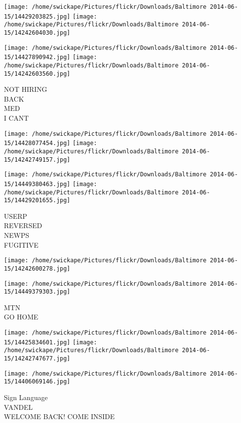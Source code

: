\documentclass[10pt,letterpaper]{article}
\begin{document}
\texttt{[image: /home/swickape/Pictures/flickr/Downloads/Baltimore 2014-06-15/14429203825.jpg]}
\texttt{[image: /home/swickape/Pictures/flickr/Downloads/Baltimore 2014-06-15/14242604030.jpg]}

\texttt{[image: /home/swickape/Pictures/flickr/Downloads/Baltimore 2014-06-15/14427890942.jpg]}
\texttt{[image: /home/swickape/Pictures/flickr/Downloads/Baltimore 2014-06-15/14242603560.jpg]}

NOT HIRING\\
BACK\\
MED\\
I CANT\\
\pagebreak

\texttt{[image: /home/swickape/Pictures/flickr/Downloads/Baltimore 2014-06-15/14428077454.jpg]}
\texttt{[image: /home/swickape/Pictures/flickr/Downloads/Baltimore 2014-06-15/14242749157.jpg]}

\texttt{[image: /home/swickape/Pictures/flickr/Downloads/Baltimore 2014-06-15/14449380463.jpg]}
\texttt{[image: /home/swickape/Pictures/flickr/Downloads/Baltimore 2014-06-15/14429201655.jpg]}

USERP\\
REVERSED\\
NEWPS\\
FUGITIVE\\
\pagebreak

\texttt{[image: /home/swickape/Pictures/flickr/Downloads/Baltimore 2014-06-15/14242600278.jpg]}

\vspace{0.25in}
\texttt{[image: /home/swickape/Pictures/flickr/Downloads/Baltimore 2014-06-15/14449379303.jpg]}

MTN\\
GO HOME\\
\pagebreak

\texttt{[image: /home/swickape/Pictures/flickr/Downloads/Baltimore 2014-06-15/14425834601.jpg]}
\texttt{[image: /home/swickape/Pictures/flickr/Downloads/Baltimore 2014-06-15/14242747677.jpg]}

\vspace{0.25in}
\texttt{[image: /home/swickape/Pictures/flickr/Downloads/Baltimore 2014-06-15/14406069146.jpg]}

Sign Language\\
VANDEL\\
WELCOME BACK!  COME INSIDE\\
\pagebreak
\end{document}

